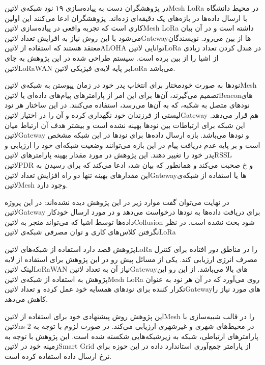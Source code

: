 در  پژوهشگران دست به پیاده‌سازی ۱۹ نود شبکه‌ی ‌لاتین{Mesh LoRa} در محیط دانشگاه با ارسال داده‌ها در بازه‌های یک دقیقه‌ای زده‌اند.
پژوهشگران ادعا می‌کنند این اولین کاری است که تجربه واقعی در پیاده‌سازی ‌لاتین{Mesh LoRa} داشته است و در آن بیان می‌شود با این روش نیاز به افرایش تعداد ‌لاتین{Gateway}ها از بین می‌رود.
نویسندگان معتقد هستند که استفاده از ‌لاتین{ALOHA} توانایی ‌لاتین{LoRa} در هندل کردن تعداد زیادی از اشیا را از بین برده است.
سیستم طراحی شده در این پژوهش به جای ‌لاتین{LoRaWAN} بر پایه لایه‌ی فیزیکی ‌لاتین{LoRa} می‌باشد.

نودها به صورت خودمختار برای انتخاب پدر خود در زمان پیوستن به شبکه‌ی ‌لاتین{Mesh} تصمیم می‌گیرند، آن‌ها برای این امر از پارامترهای پیام‌های داده‌ای یا ‌لاتین{Beacon}های نودهای متصل به شکبه، که به آن‌ها می‌رسد، استفاده می‌کنند.
در این ساختار هر نود لیستی از فرزندان خود نگهداری کرده و آن را در اختیار ‌لاتین{‌Gateway} هم قرار می‌دهد.
این شبکه برای ارتباطات بین نودها بهینه نشده است و بیشتر هدف آن ارتباط میان ‌لاتین{Gateway} و نودها می‌باشد.
بازه ارسال داده‌ها برای نودها در این شبکه مشخص است و بر پایه عدم دریافت پیام در این بازه می‌توانند وضعیت شبکه‌ای خود را ارزیابی و پدر خود را تغییر دهند.
این پژوهش در مورد مقدار بهینه پارامترهای ‌لاتین{RSSI}، ‌لاتین{PDR} و ‌خ صحبت می‌کند و همانطور که بیان شد، ادعا می‌کند که برای رسیدن به این مقدارهای بهینه تنها دو راه افزایش تعداد ‌لاتین{Gateway}ها یا استفاده از شبکه‌ی ‌لاتین{Mesh} وجود دارد.

در نهایت می‌توان گفت موارد زیر در این پژوهش دیده نشده‌اند:
 در این پروژه ‌لاتین{Gateway} برای دریافت داده‌ها به نودها درخواست می‌دهد و در مورد ارسال خودکار داده‌ها توسط اشیا که می‌تواند منجر به ‌لاتین{Collusion} شود بحث نشده است.
 در نظر نگرفتن کلاس‌های کاری و توان مصرفی شبکه‌ی ‌لاتین{LoRa}


پژوهش  قصد دارد استفاده از شبکه‌های ‌لاتین{LoRa} را در مناطق دور افتاده برای کنترل مصرف انرژی ارزیابی کند.
یکی از مسائل پیش رو در این پژوهش برای استفاده از لایه لینک ‌لاتین{LoRaWAN} نیاز آن به تعداد ‌لاتین{Gateway}های بالا می‌باشد.
از این رو این پژوهش به استفاده از شبکه‌ی ‌لاتین{Mesh LoRa} روی می‌آورد که در آن هر نود به عنوان تکرار کننده برای نودهای همسایه خود عمل کرده
و تعداد ‌لاتین{Gateway}های مورد نیاز را کاهش می‌دهد.

این پژوهش روش پیشنهادی خود برای استفاده از ‌لاتین{Mesh} را در قالب شبیه‌سازی با ‌لاتین{ns-2} در محیط‌های شهری و غیرشهری ارزیابی می‌کند.
در صورت لزوم با توجه به پارامترهای ارتباطی، شبکه به زیرشبکه‌هایی شکسته شده است.
این پژوهش با توجه به زمینه خود در ‌لاتین{Smart Grid} از پارامتر جمع‌آوری استاندارد داده در این حوزه برای نرخ ارسال داده استفاده کرده است.


